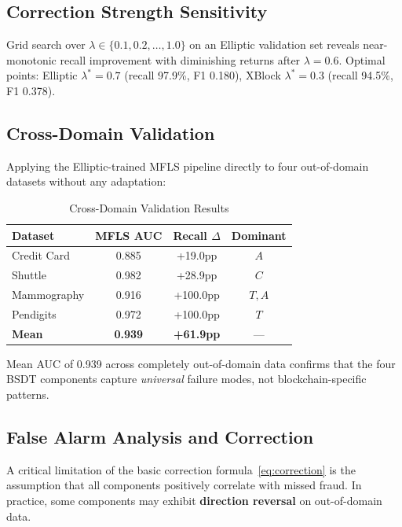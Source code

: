 \documentclass[journal]{IEEEtran}
\begin{document}
\subsection{Correction Strength Sensitivity}
\label{ssec:sensitivity}

Grid search over $\lambda \in \{0.1, 0.2, \ldots, 1.0\}$ on an Elliptic validation set reveals near-monotonic recall improvement with diminishing returns after $\lambda = 0.6$. Optimal points: Elliptic $\lambda^* = 0.7$ (recall 97.9\%, F1 0.180), XBlock $\lambda^* = 0.3$ (recall 94.5\%, F1 0.378).

\subsection{Cross-Domain Validation}
\label{ssec:crossdomain}

Applying the Elliptic-trained MFLS pipeline directly to four out-of-domain datasets without any adaptation:

\begin{table}[!t]
\centering
\caption{Cross-Domain Validation Results}
\label{tab:crossdomain}
\begin{tabular}{@{}lccc@{}}
\toprule
\textbf{Dataset} & \textbf{MFLS AUC} & \textbf{Recall $\Delta$} & \textbf{Dominant} \\
\midrule
Credit Card   & 0.885 & +19.0pp  & $A$ \\
Shuttle       & 0.982 & +28.9pp  & $C$ \\
Mammography   & 0.916 & +100.0pp & $T, A$ \\
Pendigits     & 0.972 & +100.0pp & $T$ \\
\midrule
\textbf{Mean} & \textbf{0.939} & \textbf{+61.9pp} & --- \\
\bottomrule
\end{tabular}
\end{table}

Mean AUC of 0.939 across completely out-of-domain data confirms that the four BSDT components capture \textit{universal} failure modes, not blockchain-specific patterns.

\subsection{False Alarm Analysis and Correction}
\label{ssec:false_alarm}

A critical limitation of the basic correction formula~\eqref{eq:correction} is the assumption that all components positively correlate with missed fraud. In practice, some components may exhibit \textbf{direction reversal} on out-of-domain data.
\end{document}
